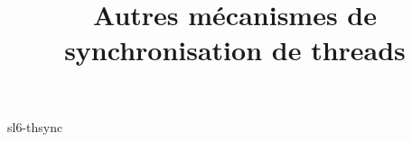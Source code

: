 \documentclass {beamer}
\title {Autres mécanismes de synchronisation de threads}
\begin{document}
 {sl6-thsync}
\end{document}
